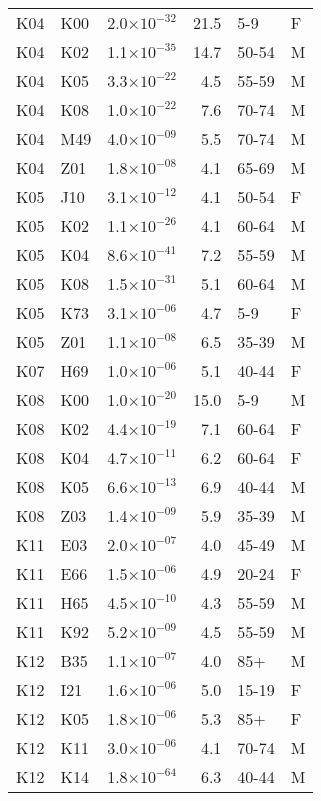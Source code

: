 \begin{longtable}{lllrll}
   K04 & K00 & 2.0$\times10^{-32}$ & 21.5 & 5-9 & F \\ 
   K04 & K02 & 1.1$\times10^{-35}$ & 14.7 & 50-54 & M \\ 
   K04 & K05 & 3.3$\times10^{-22}$ & 4.5 & 55-59 & M \\ 
   K04 & K08 & 1.0$\times10^{-22}$ & 7.6 & 70-74 & M \\ 
   K04 & M49 & 4.0$\times10^{-09}$ & 5.5 & 70-74 & M \\ 
   K04 & Z01 & 1.8$\times10^{-08}$ & 4.1 & 65-69 & M \\ 
   K05 & J10 & 3.1$\times10^{-12}$ & 4.1 & 50-54 & F \\ 
   K05 & K02 & 1.1$\times10^{-26}$ & 4.1 & 60-64 & M \\ 
   K05 & K04 & 8.6$\times10^{-41}$ & 7.2 & 55-59 & M \\ 
   K05 & K08 & 1.5$\times10^{-31}$ & 5.1 & 60-64 & M \\ 
   K05 & K73 & 3.1$\times10^{-06}$ & 4.7 & 5-9 & F \\ 
   K05 & Z01 & 1.1$\times10^{-08}$ & 6.5 & 35-39 & M \\ 
   K07 & H69 & 1.0$\times10^{-06}$ & 5.1 & 40-44 & F \\ 
   K08 & K00 & 1.0$\times10^{-20}$ & 15.0 & 5-9 & M \\ 
   K08 & K02 & 4.4$\times10^{-19}$ & 7.1 & 60-64 & F \\ 
   K08 & K04 & 4.7$\times10^{-11}$ & 6.2 & 60-64 & F \\ 
   K08 & K05 & 6.6$\times10^{-13}$ & 6.9 & 40-44 & M \\ 
   K08 & Z03 & 1.4$\times10^{-09}$ & 5.9 & 35-39 & M \\ 
   K11 & E03 & 2.0$\times10^{-07}$ & 4.0 & 45-49 & M \\ 
   K11 & E66 & 1.5$\times10^{-06}$ & 4.9 & 20-24 & F \\ 
   K11 & H65 & 4.5$\times10^{-10}$ & 4.3 & 55-59 & M \\ 
   K11 & K92 & 5.2$\times10^{-09}$ & 4.5 & 55-59 & M \\ 
   K12 & B35 & 1.1$\times10^{-07}$ & 4.0 & 85+ & M \\ 
   K12 & I21 & 1.6$\times10^{-06}$ & 5.0 & 15-19 & F \\ 
   K12 & K05 & 1.8$\times10^{-06}$ & 5.3 & 85+ & F \\ 
   K12 & K11 & 3.0$\times10^{-06}$ & 4.1 & 70-74 & M \\ 
   K12 & K14 & 1.8$\times10^{-64}$ & 6.3 & 40-44 & M \\ 

\end{longtable}
